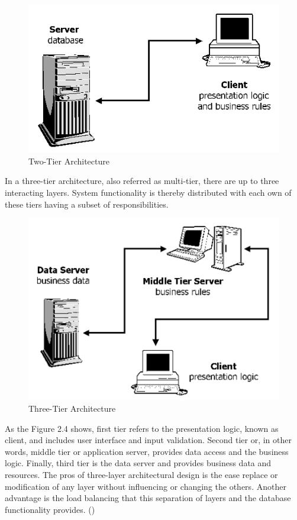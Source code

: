 \begin{figure}[h!]
	\begin{center}
		\includegraphics[scale=0.45]{images/two-tier_architecture.jpg}
	\end{center}
	\caption{Two-Tier Architecture}
\end{figure}

In a three-tier architecture, also referred as multi-tier, there are up to three interacting layers. System functionality is thereby distributed with each own of these tiers having a subset of responsibilities.

\begin{figure}[h!]
	\begin{center}
		\includegraphics[scale=0.45]{images/three-tier_architecture.jpg}
	\end{center}
	\caption{Three-Tier Architecture}
\end{figure}

As the Figure 2.4 shows, first tier refers to the presentation logic, known as client, and includes user interface and input validation. Second tier or, in other words, middle tier or application server, provides data access and the business logic. Finally, third tier is the data server and provides business data and resources. The pros of three-layer architectural design is the ease replace or modification of any layer without influencing or changing the others. Another advantage is the load balancing that this separation of layers and the database functionality provides. (\cite{Reference3})

